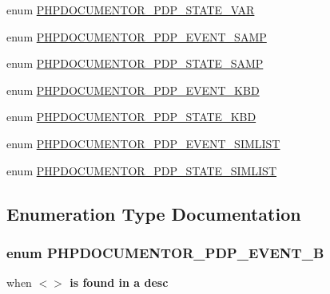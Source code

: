 \begin{DoxyCompactItemize}
\item 
enum \hyperlink{_parser_desc_cleanup_8inc_a0977989070177ee2522da8705192f9e4}{\-P\-H\-P\-D\-O\-C\-U\-M\-E\-N\-T\-O\-R\-\_\-\-P\-D\-P\-\_\-\-S\-T\-A\-T\-E\-\_\-\-V\-A\-R} 
\item 
enum \hyperlink{_parser_desc_cleanup_8inc_a72f2d59945b6ba00ed2ba0ba98eb1ff0}{\-P\-H\-P\-D\-O\-C\-U\-M\-E\-N\-T\-O\-R\-\_\-\-P\-D\-P\-\_\-\-E\-V\-E\-N\-T\-\_\-\-S\-A\-M\-P} 
\item 
enum \hyperlink{_parser_desc_cleanup_8inc_aebb5c080e57f6d3e11dec37f5722604a}{\-P\-H\-P\-D\-O\-C\-U\-M\-E\-N\-T\-O\-R\-\_\-\-P\-D\-P\-\_\-\-S\-T\-A\-T\-E\-\_\-\-S\-A\-M\-P} 
\item 
enum \hyperlink{_parser_desc_cleanup_8inc_a091c8fdbd2cdc1a1a3fee11f85369e15}{\-P\-H\-P\-D\-O\-C\-U\-M\-E\-N\-T\-O\-R\-\_\-\-P\-D\-P\-\_\-\-E\-V\-E\-N\-T\-\_\-\-K\-B\-D} 
\item 
enum \hyperlink{_parser_desc_cleanup_8inc_ae6a5da3141568bf078105063d2d45900}{\-P\-H\-P\-D\-O\-C\-U\-M\-E\-N\-T\-O\-R\-\_\-\-P\-D\-P\-\_\-\-S\-T\-A\-T\-E\-\_\-\-K\-B\-D} 
\item 
enum \hyperlink{_parser_desc_cleanup_8inc_ae88e23f092bcbfa86e4fdf1e08192297}{\-P\-H\-P\-D\-O\-C\-U\-M\-E\-N\-T\-O\-R\-\_\-\-P\-D\-P\-\_\-\-E\-V\-E\-N\-T\-\_\-\-S\-I\-M\-L\-I\-S\-T} 
\item 
enum \hyperlink{_parser_desc_cleanup_8inc_acf3e57c333e5b8ad14b6cc80806c2468}{\-P\-H\-P\-D\-O\-C\-U\-M\-E\-N\-T\-O\-R\-\_\-\-P\-D\-P\-\_\-\-S\-T\-A\-T\-E\-\_\-\-S\-I\-M\-L\-I\-S\-T} 
\end{DoxyCompactItemize}


\subsection{\-Enumeration \-Type \-Documentation}
\hypertarget{_parser_desc_cleanup_8inc_a486ad69eaaef78ab0a00db0a57519a56}{
\subsubsection[{\-P\-H\-P\-D\-O\-C\-U\-M\-E\-N\-T\-O\-R\-\_\-\-P\-D\-P\-\_\-\-E\-V\-E\-N\-T\-\_\-\-B}]{\setlength{\rightskip}{0pt plus 5cm}enum {\bf \-P\-H\-P\-D\-O\-C\-U\-M\-E\-N\-T\-O\-R\-\_\-\-P\-D\-P\-\_\-\-E\-V\-E\-N\-T\-\_\-\-B}}}\label{_parser_desc_cleanup_8inc_a486ad69eaaef78ab0a00db0a57519a56}
when $<${\bfseries $>$ is found in a desc }


